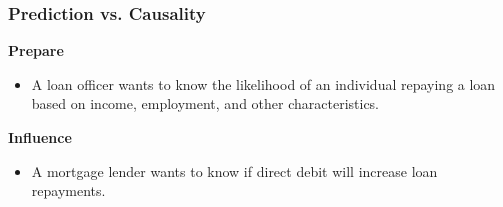 \documentclass[
  shownotes,
  xcolor={svgnames},
  hyperref={colorlinks,citecolor=DarkBlue,linkcolor=andesred,urlcolor=DarkBlue}
  , aspectratio=169]{beamer}
\begin{document}
\begin{frame}
\frametitle{Prediction vs. Causality}



\begin{minipage}[t]{0.45\linewidth}
       \begin{center}
        {\bf Prepare}
       \end{center}
       

       \begin{itemize}
       \item A loan officer wants to know the likelihood of an individual repaying a loan based on income, employment, and other characteristics.
       \end{itemize}
    \end{minipage}
    \hfill
    \begin{minipage}[t]{0.45\linewidth}%
    \begin{center}
        {\bf Influence}
       \end{center}
        

       \begin{itemize}
       \item A mortgage lender wants to know if direct debit will increase loan repayments.
       \end{itemize}
    
    \end{minipage}



\end{frame}
\end{document}
